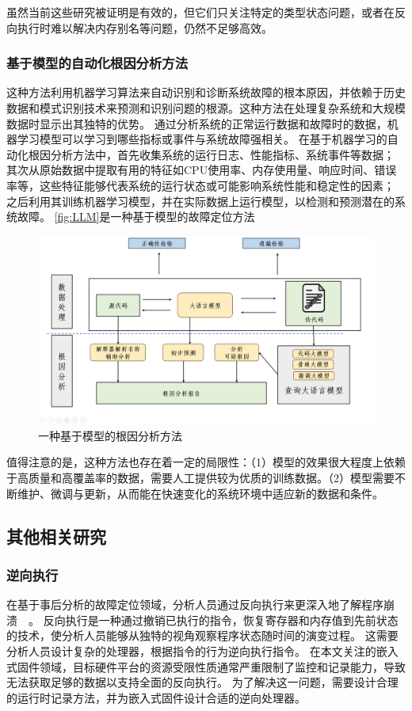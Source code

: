 虽然当前这些研究被证明是有效的，但它们只关注特定的类型状态问题，或者在反向执行时难以解决内存别名等问题，仍然不足够高效。
\subsubsection{基于模型的自动化根因分析方法}
这种方法利用机器学习算法来自动识别和诊断系统故障的根本原因，并依赖于历史数据和模式识别技术来预测和识别问题的根源。这种方法在处理复杂系统和大规模数据时显示出其独特的优势。
通过分析系统的正常运行数据和故障时的数据，机器学习模型可以学习到哪些指标或事件与系统故障强相关。
在基于机器学习的自动化根因分析方法中，首先收集系统的运行日志、性能指标、系统事件等数据；
其次从原始数据中提取有用的特征如CPU使用率、内存使用量、响应时间、错误率等，这些特征能够代表系统的运行状态或可能影响系统性能和稳定性的因素；
之后利用其训练机器学习模型，并在实际数据上运行模型，以检测和预测潜在的系统故障。
\autoref{fig:LLM}是一种基于模型的故障定位方法~\cite{How2024}
\begin{figure}[h]
    \centering
    \includegraphics[width=1.0\textwidth]{./figure/LLM.png}
    \caption{一种基于模型的根因分析方法}
    \label{fig:LLM}
\end{figure}

值得注意的是，这种方法也存在着一定的局限性：（1）模型的效果很大程度上依赖于高质量和高覆盖率的数据，需要人工提供较为优质的训练数据。（2）模型需要不断维护、微调与更新，从而能在快速变化的系统环境中适应新的数据和条件。


\subsection{其他相关研究}
\subsubsection{逆向执行}
在基于事后分析的故障定位领域，分析人员通过反向执行来更深入地了解程序崩溃~\cite{RETracer2016}~\cite{REPT}。
反向执行是一种通过撤销已执行的指令，恢复寄存器和内存值到先前状态的技术，使分析人员能够从独特的视角观察程序状态随时间的演变过程。
这需要分析人员设计复杂的处理器，根据指令的行为逆向执行指令。
在本文关注的嵌入式固件领域，目标硬件平台的资源受限性质通常严重限制了监控和记录能力，导致无法获取足够的数据以支持全面的反向执行。
为了解决这一问题，需要设计合理的运行时记录方法，并为嵌入式固件设计合适的逆向处理器。

